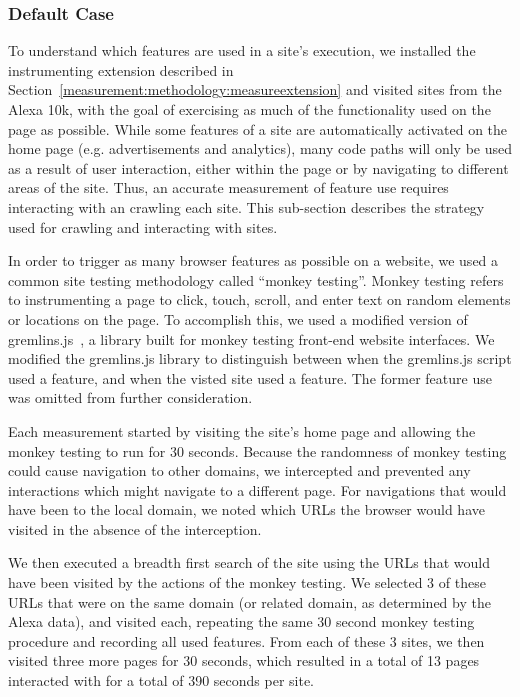 \subsubsection{Default Case}
\label{measurement:methodology:default-case-measurements}
To understand which features are used in a site's execution, we installed the
instrumenting extension described in
Section~\ref{measurement:methodology:measureextension} and visited sites from
the Alexa 10k, with the goal of exercising as much of the functionality used on
the page as possible.  While some \JS features of a site are automatically
activated on the home page (e.g. advertisements and analytics), many code paths
will only be used as a result of user interaction, either within the page or by
navigating to different areas of the site. Thus, an accurate measurement
of feature use requires interacting with an crawling each site.  This
sub-section describes the strategy used for crawling and interacting with sites.

In order to trigger as many browser features as possible on a website, we used
a common site testing methodology called ``monkey testing''.  Monkey testing
refers to instrumenting a page to click, touch, scroll, and enter text on
random elements or locations on the page.  To accomplish this, we used a
modified version of gremlins.js~\cite{zaninotto2016gremlins}, a library built
for monkey testing front-end website interfaces.  We modified the gremlins.js
library to distinguish between when the gremlins.js script used a
feature, and when the visted site used a feature.  The former feature
use was omitted from further consideration.

Each measurement started by visiting the site's home page and allowing
the monkey testing to run for 30 seconds.  Because the randomness of monkey
testing could cause navigation to other domains, we intercepted and prevented
any interactions which might navigate to a different page.  For
navigations that would have been to the local domain, we noted which URLs the
browser would have visited in the absence of the interception.

We then executed a breadth first search of the site using the
URLs that would have been visited by the actions of the monkey
testing.  We selected 3 of these URLs that were on the same domain (or
related domain, as determined by the Alexa data), and visited each, repeating
the same 30 second monkey testing procedure and recording all used features.
From each of these 3 sites, we then visited three more pages for 30 seconds,
which resulted in a total of 13 pages interacted with for a total of 390 seconds
per site.

